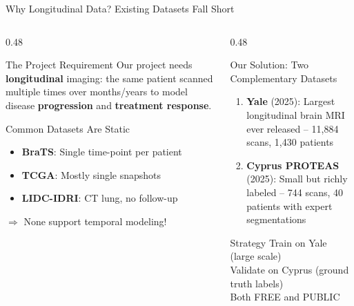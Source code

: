 \documentclass[aspectratio=169,xcolor=dvipsnames]{beamer}
\begin{document}
\begin{frame}{Why Longitudinal Data? Existing Datasets Fall Short}
    \begin{columns}
        \begin{column}{0.48\textwidth}
            \begin{alertblock}{The Project Requirement}
                \small
                Our project needs \textbf{longitudinal} imaging: the same patient scanned multiple times over months/years to model disease \textbf{progression} and \textbf{treatment response}.
            \end{alertblock}

            \vspace{0.2em}

            \begin{block}{Common Datasets Are Static}
                \small
                \begin{itemize}
                    \item \textbf{BraTS}: Single time-point per patient
                    \item \textbf{TCGA}: Mostly single snapshots
                    \item \textbf{LIDC-IDRI}: CT lung, no follow-up
                \end{itemize}
                $\Rightarrow$ None support temporal modeling!
            \end{block}
        \end{column}

        \begin{column}{0.48\textwidth}
            \begin{exampleblock}{Our Solution: Two Complementary Datasets}
                \small
                \begin{enumerate}
                    \item \textbf{Yale} (2025): Largest longitudinal brain MRI ever released -- 11,884 scans, 1,430 patients
                    \item \textbf{Cyprus PROTEAS} (2025): Small but richly labeled -- 744 scans, 40 patients with expert segmentations
                \end{enumerate}
            \end{exampleblock}

            \vspace{0.2em}

            \begin{block}{\small Strategy}
                \scriptsize
                 Train on Yale (large scale)\\
                 Validate on Cyprus (ground truth labels)\\
                 Both FREE and PUBLIC
            \end{block}
        \end{column}
    \end{columns}
\end{frame}
\end{document}
